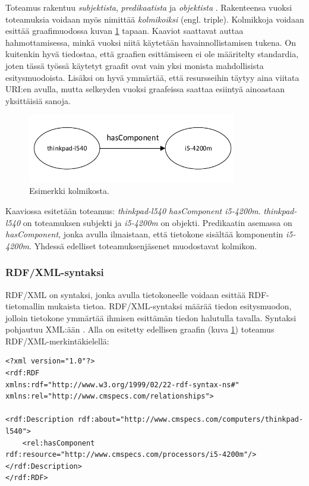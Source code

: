 \documentclass[finnish, 12pt, a4paper, elec, utf8, pdfa, online]{aaltothesis}
\begin{document}
Toteamus rakentuu \textit{subjektista}, \textit{predikaatista} ja \textit{objektista} \cite{lassila_dissertion}. Rakenteensa vuoksi toteamuksia voidaan myös nimittää \textit{kolmikoiksi} (engl. triple). Kolmikkoja voidaan esittää graafimuodossa kuvan \ref{images/RDF-triplet1} tapaan. Kaaviot saattavat auttaa hahmottamisessa, minkä vuoksi niitä käytetään havainnollistamisen tukena. On kuitenkin hyvä tiedostaa, että graafien esittämiseen ei ole määritelty standardia, joten tässä työssä käytetyt graafit ovat vain yksi monista mahdollisista esitysmuodoista. Lisäksi on hyvä ymmärtää, että resursseihin täytyy aina viitata URI:en avulla, mutta selkeyden vuoksi graafeissa saattaa esiintyä ainoastaan yksittäisiä sanoja.

\begin{figure}[htb]
\centering
\includegraphics[height=3cm]{images/RDF-triplet.pdf}
\caption{Esimerkki kolmikosta. \label{images/RDF-triplet1}}
\end{figure}

Kaaviossa esitetään toteamus: \textit{thinkpad-l540 hasComponent i5-4200m}. \textit{thinkpad-l540} on toteamuksen subjekti ja \textit{i5-4200m} on objekti. Predikaatin asemassa on \textit{hasComponent}, jonka avulla ilmaistaan, että tietokone sisältää komponentin \textit{i5-4200m}. Yhdessä edelliset toteamuksenjäsenet muodostavat kolmikon.


\subsubsection{RDF/XML-syntaksi}
RDF/XML on syntaksi, jonka avulla tietokoneelle voidaan esittää RDF-tietomallin mukaista tietoa. RDF/XML-syntaksi määrää tiedon esitysmuodon, jolloin tietokone ymmärtää ihmisen esittämän tiedon halutulla tavalla. Syntaksi pohjautuu XML:ään \cite{RDF_XML}. Alla on esitetty edellisen graafin (kuva \ref{images/RDF-triplet1}) toteamus RDF/XML-merkintäkielellä:

\vskip 0.75cm
\begin{lstlisting}[style=codeblock,caption={RDF/XML syntaksiesimerkki.},captionpos=b,label={rdf_esim}]
<?xml version="1.0"?>
<rdf:RDF
xmlns:rdf="http://www.w3.org/1999/02/22-rdf-syntax-ns#"
xmlns:rel="http://www.cmspecs.com/relationships">

<rdf:Description rdf:about="http://www.cmspecs.com/computers/thinkpad-l540">
    <rel:hasComponent rdf:resource="http://www.cmspecs.com/processors/i5-4200m"/>
</rdf:Description>
</rdf:RDF>
\end{lstlisting}
\vskip 0.75cm
\end{document}
